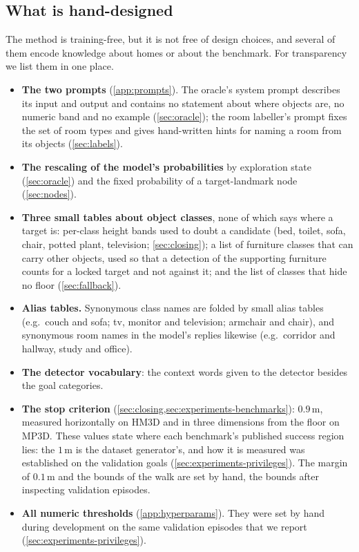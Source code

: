 \documentclass[10pt]{article}
\newcommand{\m}{\,\mathrm{m}}
\begin{document}
\subsection{What is hand-designed}\label{sec:handdesigned}
The method is training-free, but it is not free of design choices, and several
of them encode knowledge about homes or about the benchmark. For transparency
we list them in one place.
\begin{itemize}[leftmargin=*,itemsep=1pt,topsep=2pt]
  \item \textbf{The two prompts} (\cref{app:prompts}). The oracle's system
        prompt describes its input and output and contains no statement about
        where objects are, no numeric band and no example
        (\cref{sec:oracle}); the room labeller's prompt fixes the set of room
        types and gives hand-written hints for naming a room from its objects
        (\cref{sec:labels}).
  \item \textbf{The rescaling of the model's probabilities} by exploration
        state (\cref{sec:oracle}) and the fixed probability of a
        target-landmark node (\cref{sec:nodes}).
  \item \textbf{Three small tables about object classes}, none of which says
        where a target is: per-class height bands used to doubt a candidate
        (bed, toilet, sofa, chair, potted plant, television;
        \cref{sec:closing}); a list of furniture classes that can carry other
        objects, used so that a detection of the supporting furniture counts
        for a locked target and not against it; and the list of classes that
        hide no floor
        (\cref{sec:fallback}).
  \item \textbf{Alias tables.} Synonymous class names
        are folded by small alias tables (e.g.\ couch and sofa; tv, monitor
        and television; armchair and chair), and synonymous room names in the
        model's replies likewise (e.g.\ corridor and hallway, study and
        office).
  \item \textbf{The detector vocabulary}: the context words given to the
        detector besides the goal categories.
  \item \textbf{The stop criterion}
        (\cref{sec:closing,sec:experiments-benchmarks}): $0.9\m$, measured
        horizontally on HM3D and in three dimensions from the floor on MP3D.
        These values state where each benchmark's published success region
        lies: the $1\m$ is the dataset generator's, and how it is measured was
        established on the validation goals
        (\cref{sec:experiments-privileges}). The margin of $0.1\m$ and the
        bounds of the walk are set by hand, the bounds after inspecting
        validation episodes.
  \item \textbf{All numeric thresholds} (\cref{app:hyperparams}). They were set
        by hand during development on the same validation episodes that we
        report (\cref{sec:experiments-privileges}).
\end{itemize}
\end{document}

